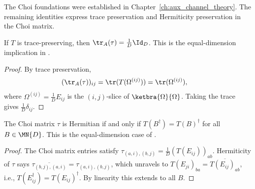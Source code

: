 The Choi foundations were established in Chapter~\ref{ch:aux_channel_theory}. The
remaining identities express trace preservation and Hermiticity preservation
in the Choi matrix.

\begin{theorem}\label{thm:traceLeft_choiMatrix_of_tp}
    \leanok
    If $T$ is trace-preserving, then
    $\tr_A(\tau) = \frac{1}{D} \Id_D$.
    This is the equal-dimension implication in
    \cite[Proposition~2.1]{Wolf2012Quantum}.
\end{theorem}

\begin{proof}
    \leanok
    By trace preservation,
    \begin{align}
        (\tr_A(\tau))_{ij}
        &= \tr(T(\Omega^{(ij)}))
         = \tr(\Omega^{(ij)}),
        \notag
    \end{align}
    where $\Omega^{(ij)} = \frac{1}{D} E_{ij}$ is the $(i,j)$-slice of
    $\ketbra{\Omega}{\Omega}$.
    Taking the trace gives $\frac{1}{D}\delta_{ij}$.
\end{proof}

\begin{theorem}\label{thm:choiMatrix_isHermitian_iff_hermiticityPreserving}
    \leanok
    The Choi matrix $\tau$ is Hermitian if and only if
    $T(B^\dagger) = T(B)^\dagger$ for all $B \in \MN{D}$.
    This is the equal-dimension case of
    \cite[Proposition~2.1]{Wolf2012Quantum}.
\end{theorem}

\begin{proof}
    \leanok
    The Choi matrix entries satisfy
    $\tau_{(a,i),(b,j)} = \frac{1}{D}(T(E_{ij}))_{ab}$.
    Hermiticity of $\tau$ says
    $\overline{\tau_{(b,j),(a,i)}} = \tau_{(a,i),(b,j)}$, which
    unravels to $T(E_{ji})_{ba} = \overline{T(E_{ij})_{ab}}$, i.e.,
    $T(E_{ij}^\dagger) = T(E_{ij})^\dagger$.
    By linearity this extends to all $B$.
\end{proof}

